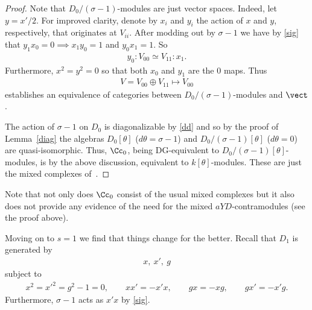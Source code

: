  \begin{proof}
Note that $D_0/(\sigma-1)$-modules are just vector spaces. Indeed, let $y=x'/2$. For improved clarity, denote by $x_i$ and $y_i$ the action of $x$ and $y$, respectively, that originates at $V_{ii}$. After modding out by $\sigma-1$ we have by \eqref{sig} that $y_1x_0=0\implies x_1y_0=1$ and $y_0x_1=1$. So
\begin{gather}
y_0:V_{00}\simeq V_{11}: x_1.
\end{gather}
Furthermore, $x^2=y^2=0$ so that both $x_0$ and $y_1$ are the $0$ maps. Thus
\begin{gather}
V=V_{00}\oplus V_{11}\mapsto V_{00}
\end{gather}
establishes an equivalence of categories between $D_0/(\sigma-1)$-modules and $\vect$.

The action of $\sigma-1$ on $D_0$ is diagonalizable by \eqref{dd} and so by the proof of Lemma~\ref{diag} the algebras $D_0[\theta]$ ($d\theta=\sigma-1$) and $D_0/(\sigma-1)[\theta]$ ($d\theta=0$) are quasi-isomorphic. Thus, $\Cc_0$, being DG-equivalent to $D_0/(\sigma-1)[\theta]$-modules, is by the above discussion, equivalent to $k[\theta]$-modules. These are just the mixed complexes of~\cite{kassel}.
\end{proof}

 \begin{Remark}
 Note that not only does $\Cc_0$ consist of the usual mixed complexes but it also does not provide any evidence of the need for the mixed $aYD$-contramodules (see the proof above).
 \end{Remark}

Moving on to $s=1$ we find that things change for the better. Recall that $D_1$ is generated by
\begin{gather}
x,\ x',\ g
\end{gather}
subject to
\begin{gather}
x^2=x'^2=g^2-1=0, \qquad
xx'=-x'x, \qquad
gx=-xg, \qquad
gx'=-x'g.
\end{gather}
Furthermore, $\sigma-1$ acts as $x'x$ by \eqref{sig}.

